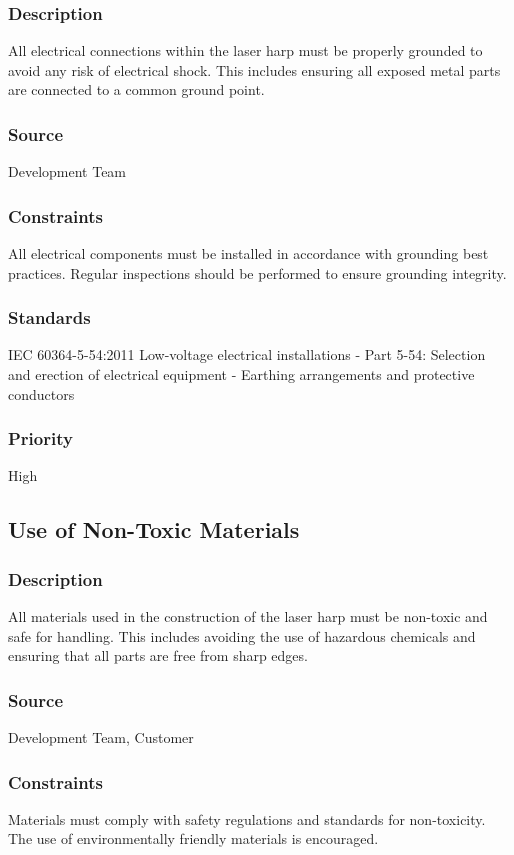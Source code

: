 \subsubsection{Description}
All electrical connections within the laser harp must be properly grounded to avoid any risk of electrical shock. This includes ensuring all exposed metal parts are connected to a common ground point.
\subsubsection{Source}
Development Team
\subsubsection{Constraints}
All electrical components must be installed in accordance with grounding best practices. Regular inspections should be performed to ensure grounding integrity.
\subsubsection{Standards}
IEC 60364-5-54:2011 Low-voltage electrical installations - Part 5-54: Selection and erection of electrical equipment - Earthing arrangements and protective conductors
\subsubsection{Priority}
High

\subsection{Use of Non-Toxic Materials}
\subsubsection{Description}
All materials used in the construction of the laser harp must be non-toxic and safe for handling. This includes avoiding the use of hazardous chemicals and ensuring that all parts are free from sharp edges.
\subsubsection{Source}
Development Team, Customer
\subsubsection{Constraints}
Materials must comply with safety regulations and standards for non-toxicity. The use of environmentally friendly materials is encouraged.
